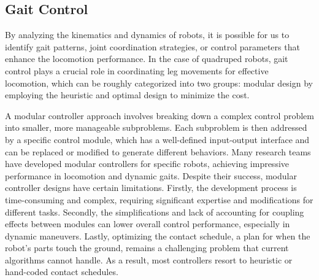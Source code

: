 \subsection{Gait Control}
By analyzing the kinematics and dynamics of robots, it is possible for us to identify gait patterns, joint coordination strategies, or control parameters that enhance the locomotion performance. In the case of quadruped robots, gait control plays a crucial role in coordinating leg movements for effective locomotion, which can be roughly categorized into two groups:  modular design by employing the heuristic and optimal design to minimize the cost. 

A modular controller approach involves breaking down a complex control problem into smaller, more manageable subproblems. Each subproblem is then addressed by a specific control module, which has a well-defined input-output interface and can be replaced or modified to generate different behaviors. Many research teams have developed modular controllers for specific robots\cite{hutter2016ANYmal, bledt2018MIT, ji2022Omnidirectional}, achieving impressive performance in locomotion and dynamic gaits. Despite their success, modular controller designs have certain limitations. Firstly, the development process is time-consuming and complex, requiring significant expertise and modifications for different tasks. Secondly, the simplifications and lack of accounting for coupling effects between modules can lower overall control performance, especially in dynamic maneuvers. Lastly, optimizing the contact schedule, a plan for when the robot's parts touch the ground, remains a challenging problem that current algorithms cannot handle\cite{bledt2018Contact}. As a result, most controllers resort to heuristic or hand-coded contact schedules.

